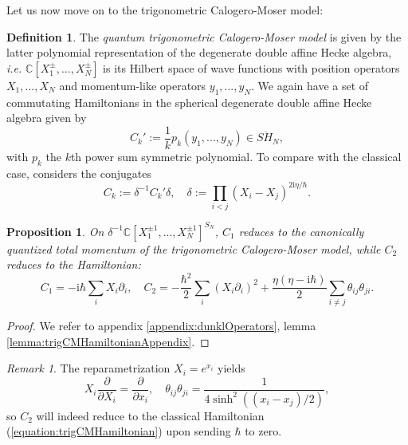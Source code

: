 \documentclass[11pt]{report}
\newtheorem{prop}[theorem]{Proposition}
\theoremstyle{definition}
\newtheorem{definition}[theorem]{Definition}
\theoremstyle{remark}
\newtheorem*{remark}{Remark}
\theoremstyle{remark}
\newcommand{\C}{\mathbb{C}}
\newcommand{\I}{\mathrm{i}}
\begin{document}
Let us now move on to the trigonometric Calogero-Moser model:

\begin{definition}
The \emph{quantum trigonometric Calogero-Moser model} is given by the latter polynomial representation of the degenerate double affine Hecke algebra, \emph{i.e.} $\C[X_1^\pm,...,X_N^\pm]$ is its Hilbert space of wave functions with position operators $X_1,...,X_N$ and momentum-like operators $y_1,...,y_N$. We again have a set of commutating Hamiltonians in the spherical degenerate double affine Hecke algebra given by
\begin{equation*}
C_k' := \frac{1}{k} p_k(y_1,...,y_N) \in S\ddot H_N,
\end{equation*}
with $p_k$ the $k$th power sum symmetric polynomial. To compare with the classical case, \cite{article:etingof:2009} considers the conjugates
\begin{equation*}
C_k := \delta^{-1} C_k' \delta, \quad \delta := \prod_{i < j} (X_i-X_j)^{2 \I \eta / \hbar}.
\end{equation*}
\end{definition}

\begin{prop}\label{prop:trigCMHamiltonian}
On $\delta^{-1} \C[X_1^{\pm 1},...,X_N^{\pm 1}]^{S_N}$, $C_1$ reduces to the canonically quantized total momentum of the trigonometric Calogero-Moser model, while $C_2$ reduces to the Hamiltonian:
\begin{equation*}
C_1 = -\I \hbar \sum_i X_i \partial_i, \quad C_2 = -\frac{\hbar^2}{2} \sum_i (X_i \partial_i)^2 + \frac{\eta(\eta-\I \hbar)}{2} \sum_{i \neq j} \theta_{ij} \theta_{ji}.
\end{equation*}
\end{prop}

\begin{proof}
We refer to appendix \ref{appendix:dunklOperators}, lemma \ref{lemma:trigCMHamiltonianAppendix}.
\end{proof}

\begin{remark}
The reparametrization $X_i = e^{x_i}$ yields
\begin{equation*}
X_i \frac{\partial}{\partial X_i} = \frac{\partial}{\partial x_i}, \quad \theta_{ij} \theta_{ji} = \frac{1}{4\sinh^2((x_i-x_j)/2)},
\end{equation*}
so $C_2$ will indeed reduce to the classical Hamiltonian (\ref{equation:trigCMHamiltonian}) upon sending $\hbar$ to zero.
\end{remark}
\end{document}
